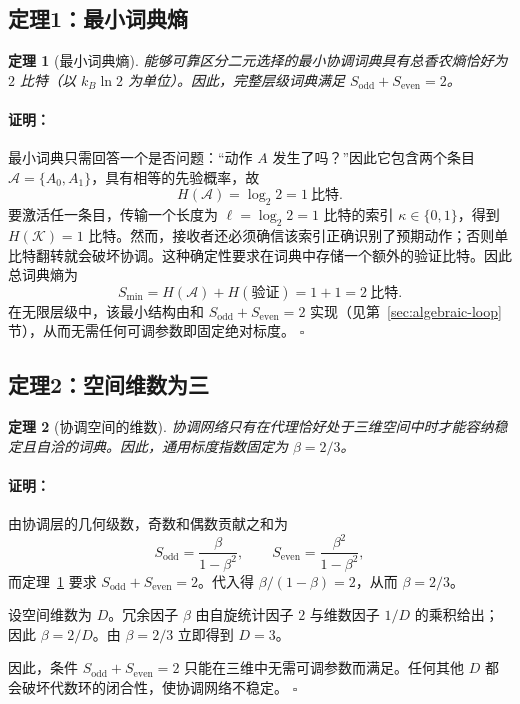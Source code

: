 \documentclass[12pt,a4paper]{article}
\newtheorem{theorem}{定理}[section]
\theoremstyle{remark}
\renewenvironment{proof}{\paragraph{证明：}}{\hfill$\square$}
\begin{document}
	\subsection{定理1：最小词典熵}
	
	\begin{theorem}[最小词典熵]
		\label{thm:minimal-dict}
		能够可靠区分二元选择的最小协调词典具有总香农熵恰好为 \(2\) 比特（以 \(k_B\ln 2\) 为单位）。因此，完整层级词典满足 \(S_{\mathrm{odd}} + S_{\mathrm{even}} = 2\)。
	\end{theorem}
	
	\begin{proof}
		最小词典只需回答一个是否问题：“动作 \(A\) 发生了吗？”因此它包含两个条目 \(\mathcal{A} = \{A_0, A_1\}\)，具有相等的先验概率，故
		\[
		H(\mathcal{A}) = \log_2 2 = 1\ \text{比特}.
		\]
		要激活任一条目，传输一个长度为 \(\ell = \log_2 2 = 1\) 比特的索引 \(\kappa \in \{0,1\}\)，得到 \(H(\mathcal{K}) = 1\) 比特。然而，接收者还必须确信该索引正确识别了预期动作；否则单比特翻转就会破坏协调。这种确定性要求在词典中存储一个额外的验证比特。因此总词典熵为
		\[
		S_{\min} = H(\mathcal{A}) + H(\text{验证}) = 1 + 1 = 2\ \text{比特}.
		\]
		在无限层级中，该最小结构由和 \(S_{\mathrm{odd}} + S_{\mathrm{even}} = 2\) 实现（见第~\ref{sec:algebraic-loop} 节），从而无需任何可调参数即固定绝对标度。
	\end{proof}
	
	\subsection{定理2：空间维数为三}
	
	\begin{theorem}[协调空间的维数]
		\label{thm:dimension}
		协调网络只有在代理恰好处于三维空间中时才能容纳稳定且自洽的词典。因此，通用标度指数固定为 \(\beta = 2/3\)。
	\end{theorem}
	
	\begin{proof}
		由协调层的几何级数，奇数和偶数贡献之和为
		\[
		S_{\mathrm{odd}} = \frac{\beta}{1-\beta^2}, \qquad
		S_{\mathrm{even}} = \frac{\beta^2}{1-\beta^2},
		\]
		而定理~\ref{thm:minimal-dict} 要求 \(S_{\mathrm{odd}} + S_{\mathrm{even}} = 2\)。代入得 \(\beta/(1-\beta) = 2\)，从而 \(\beta = 2/3\)。
		
		设空间维数为 \(D\)。冗余因子 \(\beta\) 由自旋统计因子 \(2\) 与维数因子 \(1/D\) 的乘积给出；因此 \(\beta = 2/D\)。由 \(\beta = 2/3\) 立即得到 \(D = 3\)。
		
		因此，条件 \(S_{\mathrm{odd}} + S_{\mathrm{even}} = 2\) 只能在三维中无需可调参数而满足。任何其他 \(D\) 都会破坏代数环的闭合性，使协调网络不稳定。
	\end{proof}
	
\end{document}
